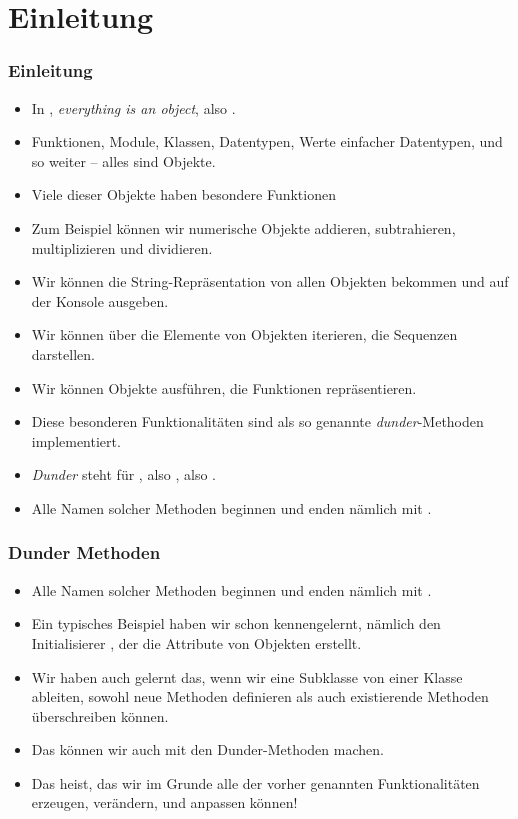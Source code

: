 \documentclass[aspectratio=169,mathserif,notheorems]{beamer}%
\subtitle{43.~Klassen/Dunder:~\texttt{\_\_str\_\_}, \texttt{\_\_repr\_\_}, und \texttt{\_\_eq\_\_}}%
\begin{document}
%
%
\startPresentation%
%
\section{Einleitung}%
\begin{frame}[t]%
\frametitle{Einleitung}%
\begin{itemize}%
%
\item In \python, \emph{everything is an object}, also .%
%
\item<2-> Funktionen, Module, Klassen, Datentypen, Werte einfacher Datentypen, und so weiter -- alles sind Objekte.%
%
\item<3-> Viele dieser Objekte haben besondere Funktionen%
%
\item<4-> Zum Beispiel können wir numerische Objekte addieren, subtrahieren, multiplizieren und dividieren.%
%
\item<5-> Wir können die String-Repräsentation von allen Objekten bekommen und auf der Konsole ausgeben.%
%
\item<6-> Wir können über die Elemente von Objekten iterieren, die Sequenzen darstellen.%
%
\item<7-> Wir können Objekte ausführen, die Funktionen repräsentieren.%
%
\item<8-> Diese besonderen Funktionalitäten sind als so genannte \emph{dunder}-Methoden implementiert.%
%
\item<9-> \emph{Dunder} steht für , also , also \pythonilIdx{\_\_}.%
%
\item<10-> Alle Namen solcher Methoden beginnen und enden nämlich mit \pythonilIdx{\_\_}.%
%
\end{itemize}%
\end{frame}%
%
%
\begin{frame}[t]%
\frametitle{Dunder Methoden}%
\begin{itemize}%
\item Alle Namen solcher Methoden beginnen und enden nämlich mit \pythonilIdx{\_\_}.%
%
\item<2-> Ein typisches Beispiel haben wir schon kennengelernt, nämlich den Initialisierer , der die Attribute von Objekten erstellt.%
%
\item<3-> Wir haben auch gelernt das, wenn wir eine Subklasse von einer Klasse ableiten, sowohl neue Methoden definieren als auch existierende Methoden überschreiben können.%
%
\item<4-> Das können wir auch mit den Dunder-Methoden machen.%
%
\item<5-> Das heist, das wir im Grunde alle der vorher genannten Funktionalitäten erzeugen, verändern, und anpassen können!%
\end{itemize}%
\end{frame}%
%
\end{document}
